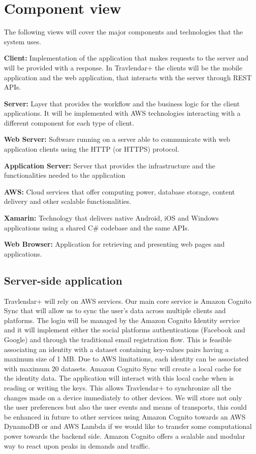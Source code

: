 \section{Component view}
\label{sec:comp_view}
The following views will cover the major components and technologies that the system uses.

\textbf{Client:} Implementation of the application that makes requests to the server and will be provided with a response. In Travlendar+ the clients will be the mobile application and the web application, that interacts with the server through REST APIs.

\textbf{Server:} Layer that provides the workflow and the business logic for the client applications. It will be implemented with AWS technologies interacting with a different component for each type of client.

\textbf{Web Server:} Software running on a server able to communicate with web application clients using the HTTP (or HTTPS) protocol.

\textbf{Application Server:} Server that provides the infrastructure and the functionalities needed to the application

\textbf{AWS:} Cloud services that offer computing power, database storage, content delivery and other scalable functionalities.

\textbf{Xamarin:} Technology that delivers native Android, iOS and Windows applications using a shared C\# codebase and the same APIs.

\textbf{Web Browser:} Application for retrieving and presenting web pages and applications.

\subsection*{Server-side application}

Travlendar+ will rely on AWS services.
Our main core service is Amazon Cognito Sync that will allow us to sync the user's data across multiple clients and platforms.
The login will be managed by the Amazon Cognito Identity service and it will implement either the social platforms authentications (Facebook and Google) and through the traditional email registration flow.
This is feasible associating an identity with a dataset containing key-values pairs having a maximum size of 1 MB. Due to AWS limitations, each identity can be associated with maximum 20 datasets.
Amazon Cognito Sync will create a local cache for the identity data. 
The application will interact with this local cache when is reading or writing the keys. 
This allows Travlendar+ to synchronize all the changes made on a device immediately to other devices.
We will store not only the user preferences but also the user events and means of transports, this could be enhanced in future to other services using Amazon Cognito towards an AWS DynamoDB or and AWS Lambda if we would like to transfer some computational power towards the backend side.
Amazon Cognito offers a scalable and modular way to react upon peaks in demands and traffic.

